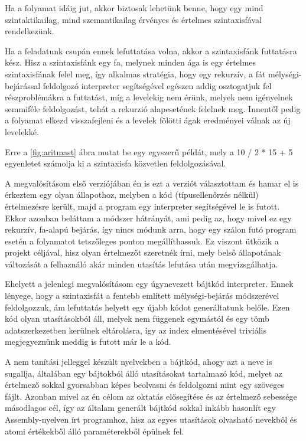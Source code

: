 Ha a folyamat idáig jut, akkor biztosak lehetünk benne, hogy egy mind szintaktikailag, mind szemantikailag érvényes és értelmes szintaxisfával rendelkezünk.

Ha a feladatunk csupán ennek lefuttatása volna, akkor a szintaxisfánk futtatásra kész. Hisz a szintaxisfánk egy fa, melynek minden ága is egy értelmes szintaxisfának felel meg, így alkalmas stratégia, hogy egy rekurzív, a fát mélységi-bejárással feldolgozó interpreter segítségével egészen addig osztogatjuk fel részproblémákra a futtatást, míg a levelekig nem érünk, melyek nem igényelnek semmiféle feldolgozást, tehát a rekurzió alapesetének felelnek meg. Innentől pedig a folyamat elkezd visszafejleni és a levelek fölötti ágak eredményei válnak az új levelekké.

Erre a \ref{fig:aritmast} ábra mutat be egy egyszerű példát, mely a 10 / 2 * 15 + 5 egyenletet számolja ki a szintaxisfa közvetlen feldolgozásával.


A megvalósításom első verziójában én is ezt a verziót választottam és hamar el is érkeztem egy olyan állapothoz, melyben a kód (típusellenőrzés nélkül) értelmezésre került, majd a program egy interpreter segítségével le is futott. Ekkor azonban beláttam a módszer hátrányát, ami pedig az, hogy mivel ez egy rekurzív, fa-alapú bejárás, így nincs módunk arra, hogy egy szálon futó program esetén a folyamatot tetszőleges ponton megállíthassuk. Ez viszont ütközik a projekt céljával, hisz olyan értelmezőt szeretnék írni, mely belső állapotának változását a felhaználó akár minden utasítás lefutása után megvizsgálhatja.

Ehelyett a jelenlegi megvalósításom egy úgynevezett bájtkód interpreter. Ennek lényege, hogy a szintaxisfát a fentebb említett mélységi-bejárás módszerével feldolgozzuk, ám lefuttatás helyett egy újabb kódot generáltatunk belőle. Ezen kód olyan utasításokból áll, melyek nem függenek egymástól és egy tömb adatszerkezetben kerülnek eltárolásra, így az index elmentésével triviális megjegyeznünk meddig is futott már le a kód.

A nem tanítási jelleggel készült nyelvekben a bájtkód, ahogy azt a neve is sugallja, általában egy bájtokból álló utasításokat tartalmazó kód, melyet az értelmező sokkal gyorsabban képes beolvasni és feldolgozni mint egy szöveges fájlt. Azonban mivel az én célom az oktatás elősegítése és az értelmező sebessége másodlagos cél, így az általam generált bájtkód sokkal inkább hasonlít egy Assembly-nyelven írt programhoz, hisz az egyes utasítások olvasható nevekből és atomi értékekből álló paraméterekből épülnek fel. 


